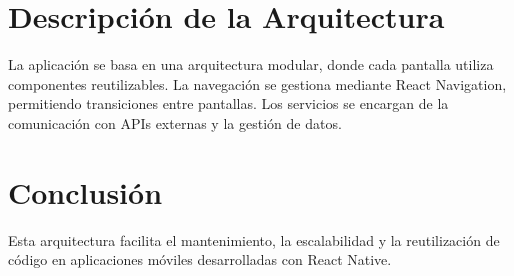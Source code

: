 \documentclass[a4paper,12pt]{article}
\begin{document}
\section{Descripción de la Arquitectura}
La aplicación se basa en una arquitectura modular, donde cada pantalla utiliza componentes reutilizables. La navegación se gestiona mediante React Navigation, permitiendo transiciones entre pantallas. Los servicios se encargan de la comunicación con APIs externas y la gestión de datos.

\section{Conclusión}
Esta arquitectura facilita el mantenimiento, la escalabilidad y la reutilización de código en aplicaciones móviles desarrolladas con React Native.
\end{document}

